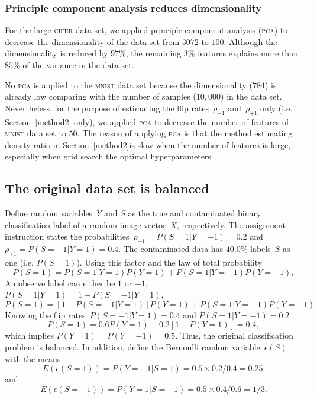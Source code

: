 \documentclass[12pt]{article} %
\newcommand{\rhoo}{\rho_{+1}}
\newcommand{\rhoz}{\rho_{-1}}
\begin{document}
\subsubsection{Principle component analysis reduces dimensionality}
For the large \textsc{cifer} data set, we applied principle component analysis (\textsc{pca}) to decrease the dimensionality of the data set from $3072$ to $100$. Although the dimensionality is reduced by $97\%$, the remaining $3\%$ features explains more than $85\%$ of the variance in the data set.

No \textsc{pca} is applied to the \textsc{mnist} data set because the dimensionality ($784$) is already low comparing with the number of samples ($10,000$) in the data set. Nevertheless, for the purpose of estimating the flip rates~$\rhoz$ and~$\rhoo$ only (i.e. Section~\ref{method2} only), we applied \textsc{pca} to decrease the number of features of \textsc{mnist} data set to $50$. The reason of applying \textsc{pca} is that the method estimating density ratio in Section~\ref{method2}is slow when the number of features is large, especially when grid search the optimal hyperparameters .

\subsection{The original data set is balanced} \label{sec:1}
Define random variables~$Y$ and $S$ as the true and contaminated binary classification label of a random image vector~$X$, respectively. The assignment instruction states the probabilities~$\rhoz=P(S=1|Y=-1)=0.2$ and $\rhoo=P(S=-1|Y=1)=0.4$.
The contaminated data has $40.0\%$ labels~$S$ as one (i.e. $P(S=1)$). Using this factor and the law of total probability
\begin{equation*}
P(S=1)=P(S=1|Y=1)P(Y=1)+P(S=1|Y=-1)P(Y=-1),
\end{equation*}
An observe label can either be $1$ or $-1$, $P(S=1|Y=1)=1-P(S=-1|Y=1)$,
\begin{equation*}
P(S=1)=\left[1-P(S=-1|Y=1)\right]P(Y=1)+P(S=1|Y=-1)P(Y=-1)
\end{equation*}
Knowing the flip rates~$P(S=-1|Y=1)=0.4$ and $P(S=1|Y=-1)=0.2$
\begin{equation}
P(S=1)=0.6P(Y=1)+0.2\left[1-P(Y=1)\right]=0.4, \label{eq:ps}
\end{equation}
which implies $P(Y=1)=P(Y=-1)=0.5$. Thus, the original classification problem is balanced.
In addition, define the Bernoulli random variable~$\epsilon(S)$ with the means 
\begin{equation}\label{eq:e1}
  E(\epsilon(S=1))=P(Y=-1|S=1)=0.5\times0.2/0.4=0.25.  
\end{equation}
and 
\begin{equation}\label{eq:em1}
  E(\epsilon(S=-1))=P(Y=1|S=-1)=0.5\times0.4/0.6=1/3.  
\end{equation}
\end{document}
